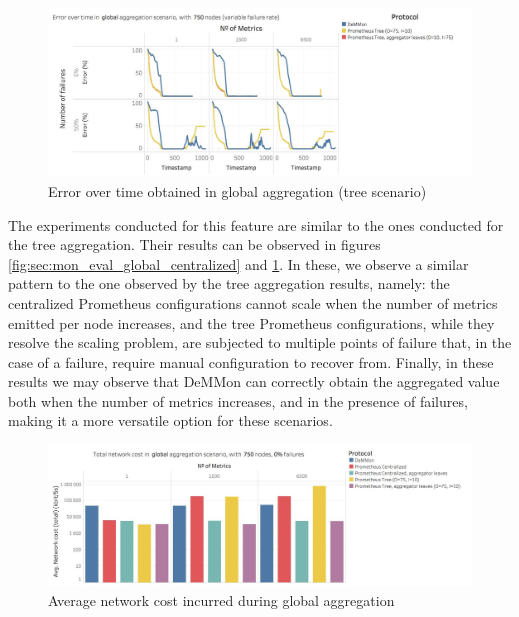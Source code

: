 \begin{figure}
    \centering
    \includegraphics[width=\linewidth]{Chapters/evaluation/figures/aggregation/Error_over_time_global_tree.jpg}
    \caption{Error over time obtained in global aggregation (tree scenario)}
    \label{fig:sec:mon_eval_global_tree}
\end{figure}

The experiments conducted for this feature are similar to the ones conducted for the tree aggregation. Their results can be observed in figures \ref{fig:sec:mon_eval_global_centralized} and \ref{fig:sec:mon_eval_global_tree}. In these, we observe a similar pattern to the one observed by the tree aggregation results, namely: the centralized Prometheus configurations cannot scale when the number of metrics emitted per node increases, and the tree Prometheus configurations, while they resolve the scaling problem, are subjected to multiple points of failure that, in the case of a failure, require manual configuration to recover from. Finally, in these results we may observe that DeMMon can correctly obtain the aggregated value both when the number of metrics increases, and in the presence of failures, making it a more versatile option for these scenarios.

\begin{figure}
    \centering
    \includegraphics[width=\linewidth]{Chapters/evaluation/figures/aggregation/network_cost_global.jpg}
    \caption{Average network cost incurred during global aggregation}
    \label{fig:sec:mon_eval_global_net_cost}
\end{figure}

